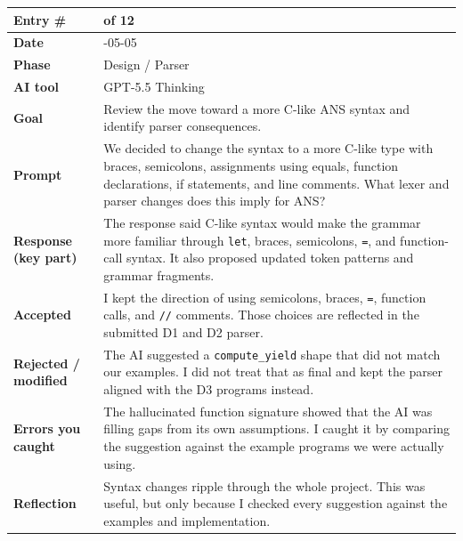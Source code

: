 \documentclass[11pt,a4paper]{article}
\newcommand{\code}[1]{\texttt{#1}}
\newcommand{\entrygap}{\vspace{8pt}}
\newenvironment{journalentry}{%
  \begin{center}\small\renewcommand{\arraystretch}{1.22}%
  \begin{tabular}{|>{\columncolor{anscodebg}\bfseries}p{3.0cm}|>{\RaggedRight\arraybackslash}p{12.25cm}|}%
  \hline
}{%
  \end{tabular}\end{center}\entrygap
}
\begin{document}
\begin{journalentry}
Entry \# & 5 of 12 \\ \hline
Date & 2026-05-05 \\ \hline
Phase & Design / Parser \\ \hline
AI tool & GPT-5.5 Thinking \\ \hline
Goal & Review the move toward a more C-like ANS syntax and identify parser consequences. \\ \hline
Prompt & We decided to change the syntax to a more C-like type with braces, semicolons, assignments using equals, function declarations, if statements, and line comments. What lexer and parser changes does this imply for ANS? \\ \hline
Response (key part) & The response said C-like syntax would make the grammar more familiar through \code{let}, braces, semicolons, \code{=}, and function-call syntax. It also proposed updated token patterns and grammar fragments. \\ \hline
Accepted & I kept the direction of using semicolons, braces, \code{=}, function calls, and \code{//} comments. Those choices are reflected in the submitted D1 and D2 parser. \\ \hline
Rejected / modified & The AI suggested a \code{compute\_yield} shape that did not match our examples. I did not treat that as final and kept the parser aligned with the D3 programs instead. \\ \hline
Errors you caught & The hallucinated function signature showed that the AI was filling gaps from its own assumptions. I caught it by comparing the suggestion against the example programs we were actually using. \\ \hline
Reflection & Syntax changes ripple through the whole project. This was useful, but only because I checked every suggestion against the examples and implementation. \\ \hline
\end{journalentry}
\end{document}
